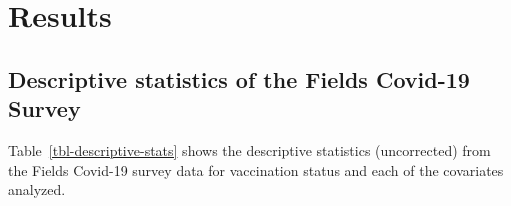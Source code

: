 \documentclass[
  letterpaper,
  DIV=11,
  numbers=noendperiod]{scrartcl}
\begin{document}
\begin{table}

\end{table}

\hypertarget{results}{%
\section{Results}\label{results}}

\hypertarget{descriptive-statistics-of-the-fields-covid-19-survey}{%
\subsection{Descriptive statistics of the Fields Covid-19
Survey}\label{descriptive-statistics-of-the-fields-covid-19-survey}}

Table~\ref{tbl-descriptive-stats} shows the descriptive statistics
(uncorrected) from the Fields Covid-19 survey data for vaccination
status and each of the covariates analyzed.
\end{document}
